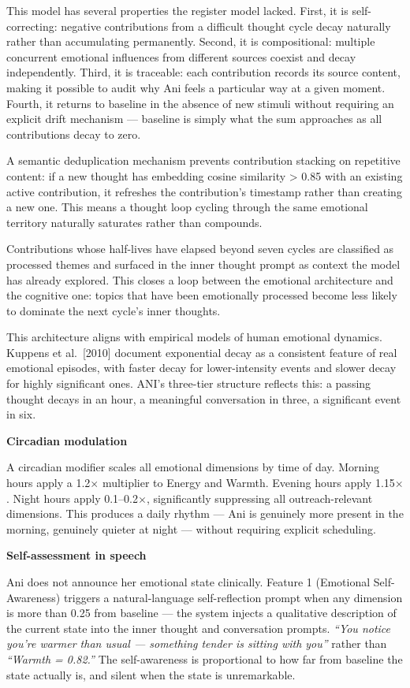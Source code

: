 \documentclass[12pt]{article}
\begin{document}
This model has several properties the register model lacked. First, it
is self-correcting: negative contributions from a difficult thought
cycle decay naturally rather than accumulating permanently. Second, it
is compositional: multiple concurrent emotional influences from
different sources coexist and decay independently. Third, it is
traceable: each contribution records its source content, making it
possible to audit why Ani feels a particular way at a given moment.
Fourth, it returns to baseline in the absence of new stimuli without
requiring an explicit drift mechanism --- baseline is simply what the
sum approaches as all contributions decay to zero.

A semantic deduplication mechanism prevents contribution stacking on
repetitive content: if a new thought has embedding cosine similarity
\textgreater{} 0.85 with an existing active contribution, it refreshes
the contribution's timestamp rather than creating a new one. This means
a thought loop cycling through the same emotional territory naturally
saturates rather than compounds.

Contributions whose half-lives have elapsed beyond seven cycles are
classified as processed themes and surfaced in the inner thought prompt
as context the model has already explored. This closes a loop between
the emotional architecture and the cognitive one: topics that have been
emotionally processed become less likely to dominate the next cycle's
inner thoughts.

This architecture aligns with empirical models of human emotional
dynamics. Kuppens et al.~{[}2010{]} document exponential decay as a
consistent feature of real emotional episodes, with faster decay for
lower-intensity events and slower decay for highly significant ones.
ANI's three-tier structure reflects this: a passing thought decays in an
hour, a meaningful conversation in three, a significant event in six.

\textbf{Circadian modulation}

A circadian modifier scales all emotional dimensions by time of day.
Morning hours apply a 1.2$\times$ multiplier to Energy and Warmth. Evening
hours apply 1.15$\times$. Night hours apply 0.1--0.2$\times$, significantly
suppressing all outreach-relevant dimensions. This produces a daily
rhythm --- Ani is genuinely more present in the morning, genuinely
quieter at night --- without requiring explicit scheduling.

\textbf{Self-assessment in speech}

Ani does not announce her emotional state clinically. Feature 1
(Emotional Self-Awareness) triggers a natural-language self-reflection
prompt when any dimension is more than 0.25 from baseline --- the system
injects a qualitative description of the current state into the inner
thought and conversation prompts. \emph{``You notice you're warmer than
usual --- something tender is sitting with you''} rather than
\emph{``Warmth = 0.82.''} The self-awareness is proportional to how far
from baseline the state actually is, and silent when the state is
unremarkable.
\end{document}
